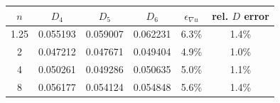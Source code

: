 \begin{tabular}{@{}cccccc@{}}
\toprule
$n$ & $D_{4}$ & $D_{5}$ & $D_{6}$ & $\epsilon_{\nabla u}$ & rel. $D$ error \\
\midrule
1.25 & 0.055193 & 0.059007 & 0.062231 & 6.3\% & 1.4\% \\
2 & 0.047212 & 0.047671 & 0.049404 & 4.9\% & 1.0\% \\
4 & 0.050261 & 0.049286 & 0.050635 & 5.0\% & 1.1\% \\
8 & 0.056177 & 0.054124 & 0.054848 & 5.6\% & 1.4\% \\
\bottomrule
\end{tabular}